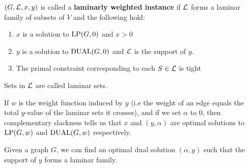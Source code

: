 \documentclass[./main.tex]{subfiles}
\begin{document}
	\begin{definition}
		$(G,\mathcal{L},x,y)$ is called a \textbf{laminarly weighted instance} if $\mathcal{L}$ forms a laminar family of subsets of $V$ and the following hold:
		\begin{enumerate}
			\item $x$ is a solution to $\textup{LP}(G,0)$ and $x > 0$
			\item $y$ is a solution to $\textup{DUAL}(G,0)$ and $\mathcal{L}$ is the support of $y$.
			\item The primal constraint corresponding to each $S\in \mathcal{L}$ is tight
		\end{enumerate}
		Sets in $\mathcal{L}$ are called laminar sets.
	\end{definition}

	If $w$ is the weight function induced by $y$ (i.e the weight of an edge equals the total $y$-value of the laminar sets it crosses), and if we set $\alpha$ to $0$, then complementary slackness tells us that $x$ and $(y,\alpha)$ are optimal solutions to $\textup{LP}(G,w)$ and $\textup{DUAL}(G,w)$ respectively.\\

	\begin{claim*}
		Given a graph $G$, we can find an optimal dual solution $(\alpha, y)$ such that the support of $y$ forms a laminar family.
	\end{claim*}
\end{document}
